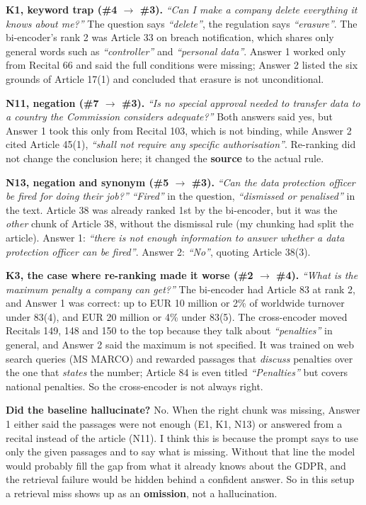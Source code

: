 \documentclass[10pt,a4paper]{article}
\newcommand{\q}[1]{\textit{``#1''}}
\begin{document}
\textbf{K1, keyword trap (\#4 $\to$ \#3).} \q{Can I make a company delete everything it knows about me?}
The question says \q{delete}, the regulation says \q{erasure}. The bi-encoder's rank 2 was Article 33 on breach notification, which shares only general words such as \q{controller} and \q{personal data}.
Answer 1 worked only from Recital 66 and said the full conditions were missing; Answer 2 listed the six grounds of Article 17(1) and concluded that erasure is not unconditional.

\textbf{N11, negation (\#7 $\to$ \#3).} \q{Is no special approval needed to transfer data to a country the Commission considers adequate?}
Both answers said yes, but Answer 1 took this only from Recital 103, which is not binding, while Answer 2 cited Article 45(1), \q{shall not require any specific authorisation}.
Re-ranking did not change the conclusion here; it changed the \textbf{source} to the actual rule.

\textbf{N13, negation and synonym (\#5 $\to$ \#3).} \q{Can the data protection officer be fired for doing their job?}
\q{Fired} in the question, \q{dismissed or penalised} in the text. Article 38 was already ranked 1st by the bi-encoder, but it was the \emph{other} chunk of Article 38, without the dismissal rule (my chunking had split the article).
Answer 1: \q{there is not enough information to answer whether a data protection officer can be fired}. Answer 2: \q{No}, quoting Article 38(3).

\textbf{K3, the case where re-ranking made it worse (\#2 $\to$ \#4).} \q{What is the maximum penalty a company can get?}
The bi-encoder had Article 83 at rank 2, and Answer 1 was correct: up to EUR 10 million or 2\% of worldwide turnover under 83(4), and EUR 20 million or 4\% under 83(5).
The cross-encoder moved Recitals 149, 148 and 150 to the top because they talk about \q{penalties} in general, and Answer 2 said the maximum is not specified.
It was trained on web search queries (MS MARCO) and rewarded passages that \emph{discuss} penalties over the one that \emph{states} the number; Article 84 is even titled \q{Penalties} but covers national penalties.
So the cross-encoder is not always right.

\textbf{Did the baseline hallucinate?} No. When the right chunk was missing, Answer 1 either said the passages were not enough (E1, K1, N13) or answered from a recital instead of the article (N11).
I think this is because the prompt says to use only the given passages and to say what is missing.
Without that line the model would probably fill the gap from what it already knows about the GDPR, and the retrieval failure would be hidden behind a confident answer.
So in this setup a retrieval miss shows up as an \textbf{omission}, not a hallucination.
\end{document}
